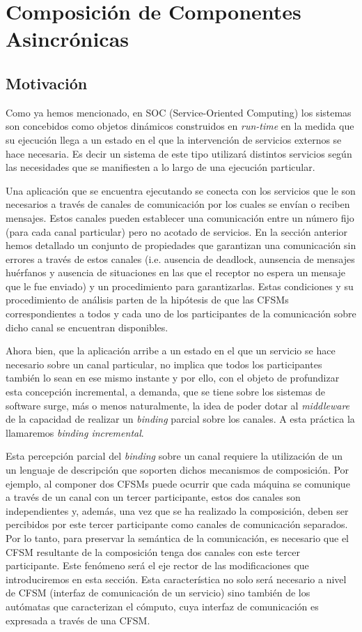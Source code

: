 \documentclass[paper=a4, fontsize=11pt, spanish]{scrartcl} %
\numberwithin{equation}{section} %
\numberwithin{figure}{section} %
\numberwithin{table}{section} %
\begin{document}
\section{Composición de Componentes Asincrónicas}
\subsection{Motivación}

 Como ya hemos mencionado, en SOC (Service-Oriented Computing) los sistemas son concebidos como objetos dinámicos construidos en \emph{run-time} en la medida que su ejecución llega a un estado en el que la intervención de servicios externos se hace necesaria. Es decir un sistema de este tipo utilizará distintos servicios según las necesidades que se manifiesten a lo largo de una ejecución particular. 
 
 Una aplicación que se encuentra ejecutando se conecta con los servicios que le son necesarios a través de canales de comunicación por los cuales se envían o reciben mensajes. Estos canales pueden establecer una comunicación entre un número fijo (para cada canal particular) pero no acotado de servicios. En la sección anterior hemos detallado un conjunto de propiedades que garantizan una comunicación sin errores a través de estos canales (i.e. ausencia de deadlock, aunsencia de mensajes huérfanos y ausencia de situaciones en las que el receptor no espera un mensaje que le fue enviado) y un procedimiento para garantizarlas. Estas condiciones y su procedimiento de análisis parten de la hipótesis de que las CFSMs correspondientes a todos y cada uno de los participantes de la comunicación sobre dicho canal se encuentran disponibles.

Ahora bien, que la aplicación arribe a un estado en el que un servicio se hace necesario sobre un canal particular, no implica que todos los participantes también lo sean en ese mismo instante y por ello, con el objeto de profundizar esta concepción incremental, a demanda, que se tiene sobre los sistemas de software surge, más o menos naturalmente, la idea de poder dotar al \emph{middleware} de la capacidad de realizar un \emph{binding} parcial sobre los canales. A esta práctica la llamaremos \emph{binding incremental}.
 
Esta percepción parcial del \emph{binding} sobre un canal requiere la utilización de un un lenguaje de descripción que soporten dichos mecanismos de composición. Por ejemplo, al componer dos CFSMs puede ocurrir que cada máquina se comunique a través de un canal con un tercer participante, estos dos canales son independientes y, además, una vez que se ha realizado la composición, deben ser percibidos por este tercer participante como canales de comunicación separados. Por lo tanto, para preservar la semántica de la comunicación, es necesario que el CFSM resultante de la composición tenga dos canales con este tercer participante. Este fenómeno será el eje rector de las modificaciones que introduciremos en esta sección. Esta característica no solo será necesario a nivel de CFSM (interfaz de comunicación de un servicio) sino también de los autómatas que caracterizan el cómputo, cuya interfaz de comunicación es expresada a través de una CFSM.
\end{document}
